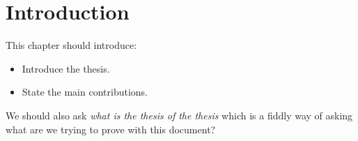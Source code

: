 \documentclass[thesis.tex]{subfiles}
\begin{document}
\chapter{Introduction}

\begin{todo}
  This chapter should introduce:
  \begin{itemize}
  \item Introduce the thesis.
  \item State the main contributions.
  \end{itemize}

  We should also ask \emph{what is the thesis of the thesis} which is a fiddly
  way of asking what are we trying to prove with this document?
\end{todo}
\end{document}
